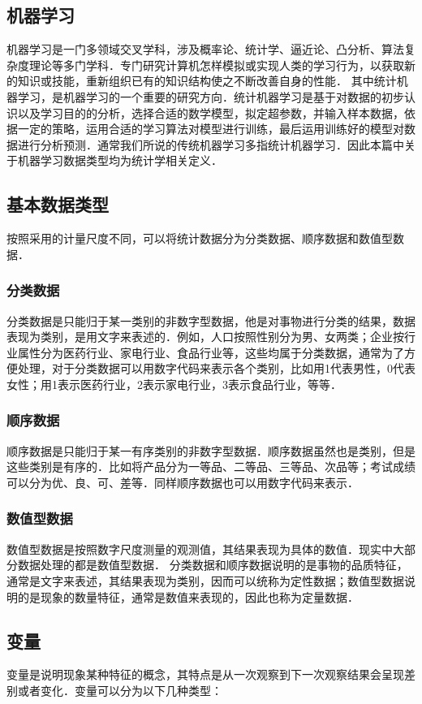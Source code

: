 \subsection{机器学习}
机器学习是一门多领域交叉学科，涉及概率论、统计学、逼近论、凸分析、算法复杂度理论等多门学科．专门研究计算机怎样模拟或实现人类的学习行为，以获取新的知识或技能，重新组织已有的知识结构使之不断改善自身的性能．
其中统计机器学习，是机器学习的一个重要的研究方向．统计机器学习是基于对数据的初步认识以及学习目的的分析，选择合适的数学模型，拟定超参数，并输入样本数据，依据一定的策略，运用合适的学习算法对模型进行训练，最后运用训练好的模型对数据进行分析预测．通常我们所说的传统机器学习多指统计机器学习．因此本篇中关于机器学习数据类型均为统计学相关定义．

\subsection{基本数据类型}
按照采用的计量尺度不同，可以将统计数据分为分类数据、顺序数据和数值型数据．
\subsubsection{分类数据}
分类数据是只能归于某一类别的非数字型数据，他是对事物进行分类的结果，数据表现为类别，是用文字来表述的．例如，人口按照性别分为男、女两类；企业按行业属性分为医药行业、家电行业、食品行业等，这些均属于分类数据，通常为了方便处理，对于分类数据可以用数字代码来表示各个类别，比如用1代表男性，0代表女性；用1表示医药行业，2表示家电行业，3表示食品行业，等等．
\subsubsection{顺序数据}
顺序数据是只能归于某一有序类别的非数字型数据．顺序数据虽然也是类别，但是这些类别是有序的．比如将产品分为一等品、二等品、三等品、次品等；考试成绩可以分为优、良、可、差等．同样顺序数据也可以用数字代码来表示．
\subsubsection{数值型数据}
数值型数据是按照数字尺度测量的观测值，其结果表现为具体的数值．现实中大部分数据处理的都是数值型数据．
分类数据和顺序数据说明的是事物的品质特征，通常是文字来表述，其结果表现为类别，因而可以统称为定性数据；数值型数据说明的是现象的数量特征，通常是数值来表现的，因此也称为定量数据．
\subsection{变量}
变量是说明现象某种特征的概念，其特点是从一次观察到下一次观察结果会呈现差别或者变化．变量可以分为以下几种类型：
